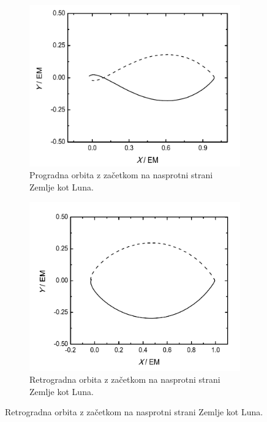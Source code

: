 \documentclass[11pt, titlepage]{article}
\begin{document}
\begin{figure}[H]
    \centering
    \begin{subfigure}[b]{0.45\textwidth}
        \centering
        \includegraphics[width=\textwidth]{figures/theory_orbit_1.png}
        \caption{Progradna orbita z začetkom na nasprotni strani Zemlje kot Luna.}
        \label{fig:orbit_1}
    \end{subfigure}
    \hfill
    \begin{subfigure}[b]{0.45\textwidth}
        \centering
        \includegraphics[width=\textwidth]{figures/theory_orbit_2.png}
        \caption{Retrogradna orbita z začetkom na nasprotni strani Zemlje kot Luna.}
        \label{fig:orbit_2}
    \end{subfigure}


\end{figure}
\end{document}
